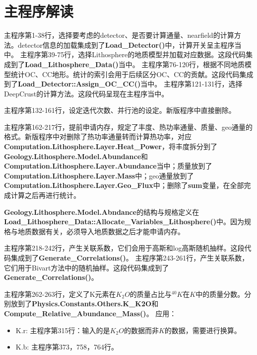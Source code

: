 	\section{主程序解读}
		\begin{GCBox}[title = 模拟设定]{}
			主程序第1-38行，选择要考虑的detector、是否要计算通量、nearfield的计算方法。detector信息的加载集成到了\textbf{Load\_Detector()}中，计算开关呈主程序当中。
		\tcbline
			主程序第39-75行，选择Lithosphere的地质模型并加载对应数据。这段代码集成到了\textbf{Load\_Lithosphere\_Data()}当中。
		\tcbline
			主程序第76-120行，根据不同地质模型统计OC、CC地形。统计的索引会用于后续区分OC、CC的贡献。这段代码集成到了\textbf{Load\_Detector::Assign\_OC\_CC()}当中。
		\tcbline
			主程序第121-131行，选择DeepCrust的计算方法。这段代码呈现在主程序当中。\par
			主程序第132-161行，设定迭代次数、并行池的设定。新版程序中直接删除。\par
			主程序第162-217行，提前申请内存，规定了丰度、热功率通量、质量、geo通量的格式。新版程序中对删除了热功率通量转而计算热功率，对应\textbf{Computation.Lithosphere.Layer.Heat\_Power}，将丰度拆分到了\textbf{Geology.Lithosphere.Model.Abundance}和\textbf{Computation.Lithosphere.Layer.Abundance}当中；质量放到了\textbf{Computation.Lithosphere.Layer.Mass}中；geo通量放到了\textbf{Computation.Lithosphere.Layer.Geo\_Flux}中；删除了\textbf{sum}变量，在全部完成计算之后再进行统计。\par
			\textbf{Geology.Lithosphere.Model.Abndance}的结构与规格定义在\\
			\textbf{Load\_Lithosphere\_Data::Allocate\_Variables\_Lithosphere()}中。因为规格与地质数据有关，必须导入地质数据之后才能申请内存。
		\end{GCBox}
		\begin{GCBox}[title = 关联系数]{}
			主程序第218-242行，产生关联系数，它们会用于高斯和log高斯随机抽样。这段代码集成到了\textbf{Generate\_Correlations()}。
		\tcbline
			主程序第243-261行，产生关联系数，它们用于Bivart方法中的随机抽样。这段代码集成到了\textbf{Generate\_Correlations()}。
		\end{GCBox}
		\begin{GCBox}[title = K的相关系数]{}
			主程序第262-263行，定义了K元素在$K_2O$的质量占比与${}^{40}K$在$K$中的质量分数。分别放到了\textbf{Physics.Constants.Others.K\_K2O}和\textbf{Compute\_Relative\_Abundance\_Mass()}。
			\tcbline
			应用：
				\begin{itemize}
					\item K.r: 主程序第315行：输入的是$K_2O$的数据而非$K$的数据，需要进行换算。
					\item K.b: 主程序第373，758，764行。
				\end{itemize}
		\end{GCBox}
